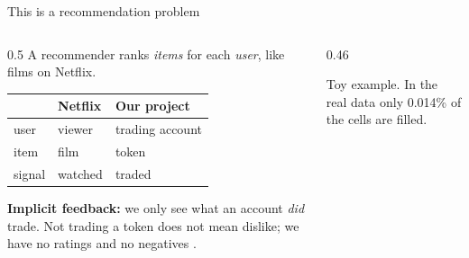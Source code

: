\documentclass[aspectratio=169,10pt]{beamer}
\begin{document}
\begin{frame}{This is a recommendation problem}
  \begin{columns}[c]
    \begin{column}{0.5\textwidth}
      \small
      A recommender ranks \emph{items} for each \emph{user}, like films on Netflix.
      \begin{center}
      \begin{tabular}{@{}lll@{}}
        \toprule
                  & Netflix & Our project \\
        \midrule
        user      & viewer  & trading account \\
        item      & film    & token \\
        signal    & watched & traded \\
        \bottomrule
      \end{tabular}
      \end{center}
      \textbf{Implicit feedback:} we only see what an account \emph{did} trade.
      Not trading a token does not mean dislike; we have no ratings and no negatives \cite{hu2008,rendle2009}.
    \end{column}
    \begin{column}{0.46\textwidth}
      \centering
      \par\scriptsize\color{grey} Toy example. In the real data only 0.014\% of the cells are filled.
    \end{column}
  \end{columns}
\end{frame}
\end{document}
